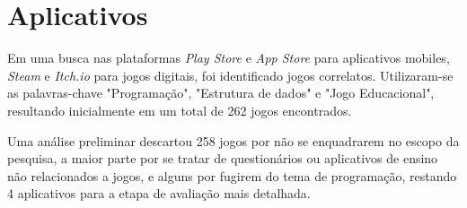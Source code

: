 \section{Aplicativos}

Em uma busca nas plataformas \emph{Play Store} e \emph{App Store} para aplicativos mobiles, \emph{Steam} e \emph{Itch.io} para jogos digitais, foi identificado jogos correlatos. Utilizaram-se as palavras-chave "Programação", "Estrutura de dados" e "Jogo Educacional", resultando inicialmente em um total de 262 jogos encontrados.

Uma análise preliminar descartou 258 jogos por não se enquadrarem no escopo da pesquisa, a maior parte por se tratar de questionários ou aplicativos de ensino não relacionados a jogos, e alguns por fugirem do tema de programação, restando 4 aplicativos para a etapa de avaliação mais detalhada.







